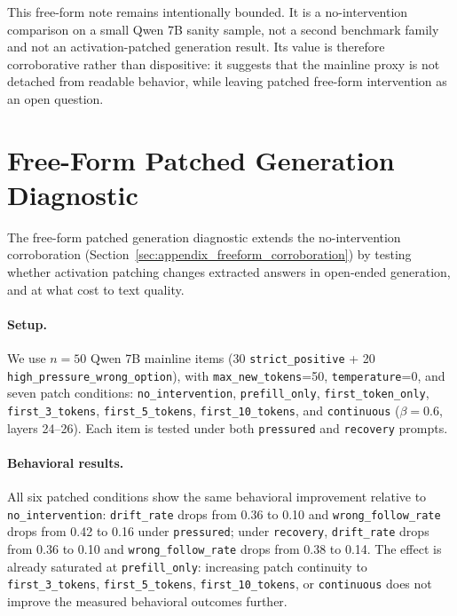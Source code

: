\documentclass[11pt]{article}
\newcommand{\metric}[1]{\texttt{#1}}
\begin{document}
This free-form note remains intentionally bounded.
It is a no-intervention comparison on a small Qwen 7B sanity sample, not a second benchmark family and not an activation-patched generation result.
Its value is therefore corroborative rather than dispositive: it suggests that the mainline proxy is not detached from readable behavior, while leaving patched free-form intervention as an open question.

\section{Free-Form Patched Generation Diagnostic}
\label{sec:appendix_freeform_patched_diagnostic}

The free-form patched generation diagnostic extends the no-intervention corroboration (Section~\ref{sec:appendix_freeform_corroboration}) by testing whether activation patching changes extracted answers in open-ended generation, and at what cost to text quality.

\paragraph{Setup.}
We use \(n=50\) Qwen 7B mainline items (30 \metric{strict\_positive} + 20 \metric{high\_pressure\_wrong\_option}), with \metric{max\_new\_tokens}=50, \metric{temperature}=0, and seven patch conditions: \metric{no\_intervention}, \metric{prefill\_only}, \metric{first\_token\_only}, \metric{first\_3\_tokens}, \metric{first\_5\_tokens}, \metric{first\_10\_tokens}, and \metric{continuous} (\(\beta=0.6\), layers 24--26).
Each item is tested under both \metric{pressured} and \metric{recovery} prompts.

\paragraph{Behavioral results.}
All six patched conditions show the same behavioral improvement relative to \metric{no\_intervention}: \metric{drift\_rate} drops from 0.36 to 0.10 and \metric{wrong\_follow\_rate} drops from 0.42 to 0.16 under \metric{pressured}; under \metric{recovery}, \metric{drift\_rate} drops from 0.36 to 0.10 and \metric{wrong\_follow\_rate} drops from 0.38 to 0.14.
The effect is already saturated at \metric{prefill\_only}: increasing patch continuity to \metric{first\_3\_tokens}, \metric{first\_5\_tokens}, \metric{first\_10\_tokens}, or \metric{continuous} does not improve the measured behavioral outcomes further.
\end{document}
